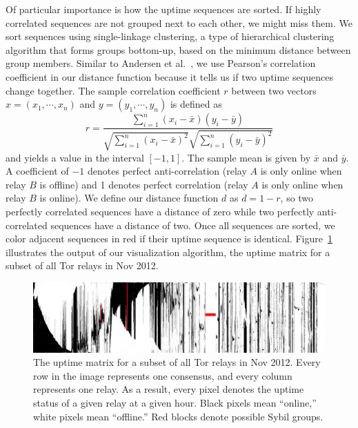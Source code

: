 Of particular importance is how the uptime sequences are sorted.  If highly
correlated sequences are not grouped next to each other, we might miss them.  We
sort sequences using single-linkage clustering, a type of hierarchical
clustering algorithm that forms groups bottom-up, based on the minimum distance
between group members.  Similar to Andersen et al.~\cite{Andersen2002a}, we use
Pearson's correlation coefficient in our distance function because it tells us
if two uptime sequences change together.  The sample correlation coefficient $r$
between two vectors $x = (x_1, \cdots, x_n)$ and $y = (y_1, \cdots, y_n)$ is
defined as
$$
r = \frac{\sum_{i=1}^{n} (x_{i} - \bar{x}) (y_{i} - \bar{y})}
{\sqrt{\sum_{i=1}^{n} (x_{i} - \bar{x})^2} \sqrt{\sum_{i=1}^{n} (y_{i} - \bar{y})^2}}
$$
and yields a value in the interval $[-1, 1]$.  The sample mean is given by
$\bar{x}$ and $\bar{y}$.  A coefficient of \(-1\) denotes perfect
anti-correlation (relay $A$ is only online when relay $B$ is offline) and 1
denotes perfect correlation (relay $A$ is only online when relay $B$ is online).
We define our distance function $d$ as $d = 1 - r$, so two perfectly correlated
sequences have a distance of zero while two perfectly anti-correlated sequences
have a distance of two.  Once all sequences are sorted, we color adjacent
sequences in red if their uptime sequence is identical.
Figure~\ref{fig:uptime-matrix} illustrates the output of our visualization
algorithm, the uptime matrix for a subset of all Tor relays in Nov 2012.

\begin{figure}[t]
	\centering
	\includegraphics[width=\linewidth]{diagrams/2012-11.jpg}
	\caption{The uptime matrix for a subset of all Tor relays in Nov 2012.
		Every row in the image represents one consensus, and every column
		represents one relay.  As a result, every pixel denotes the uptime
		status of a given relay at a given hour.  Black pixels mean ``online,''
		white pixels mean ``offline.''  Red blocks denote possible Sybil
		groups.}
	\label{fig:uptime-matrix}
\end{figure}

